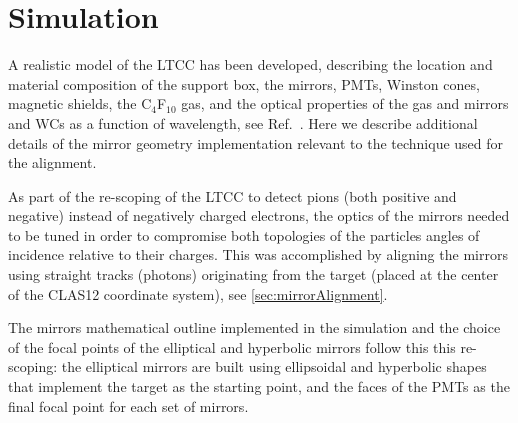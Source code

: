 \section{Simulation}

A realistic model of the LTCC has been developed, describing the location and material composition
of the support box, the mirrors, PMTs, Winston cones, magnetic shields, the C$_4$F$_{10}$ gas, and the
optical properties of the gas and mirrors and WCs as a function of wavelength, see Ref.~\cite{sim-nim}.
Here we describe additional details of the mirror geometry implementation relevant to the technique
used for the alignment.


As part of the re-scoping of the LTCC to detect pions (both positive and negative) instead of
negatively charged electrons, the optics of the mirrors needed to be tuned in order to compromise
both topologies of the particles angles of incidence relative to their charges.
This was accomplished by aligning the mirrors using straight tracks (photons) originating from the target
(placed at the center of the CLAS12 coordinate system), see \ref{sec:mirrorAlignment}.

The mirrors mathematical outline implemented in the simulation and the choice of the
focal points of the elliptical and hyperbolic mirrors  follow this
this re-scoping: the elliptical mirrors are built using ellipsoidal and hyperbolic shapes
that implement the target as the starting point, and the faces of the PMTs as the final focal point
for each set of mirrors.


